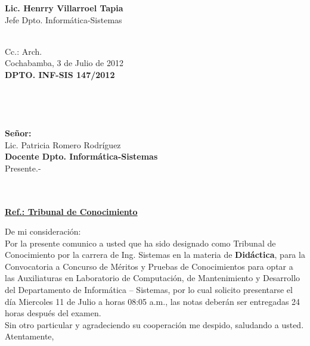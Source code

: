 \documentclass[letterpaper,11pt]{letter}
\begin{document}
\vspace{3.5cm}
\begin{center}
\begin{minipage}[b]{0.5\textwidth}
\begin{center}
{\bf Lic. Henrry Villarroel Tapia}\\
Jefe Dpto. Informática-Sistemas\\
\end{center}
\end{minipage}
\end{center}
~\\
Cc.: Arch.\\
\newpage
Cochabamba, 3 de Julio de 2012~\\
 \textbf{DPTO. INF-SIS 147/2012}\\
~\\
~\\
~\\
~\\
 \textbf{Señor:}~\\
Lic. Patricia Romero Rodríguez~\\
 \textbf{Docente Dpto. Informática-Sistemas}~\\
Presente.-\\
~\\
~\\
\begin{center}
\underline{ \textbf{Ref.: Tribunal de Conocimiento}}
\end{center}
De mi consideración:\\
Por la presente comunico a usted que ha sido designado como Tribunal de Conocimiento por la carrera de Ing. Sistemas en la materia de \textbf{Didáctica}, para la Convocatoria a Concurso de Méritos y Pruebas de Conocimientos para optar a las Auxiliaturas en Laboratorio de Computación, de Mantenimiento y Desarrollo del Departamento de Informática – Sistemas, por lo cual solicito presentarse el día Miercoles 11 de Julio a horas 08:05 a.m., las notas deberán ser entregadas 24 horas después del examen.\\
Sin otro particular y agradeciendo su cooperación me despido, saludando a usted.\\
Atentamente,\\
\end{document}
